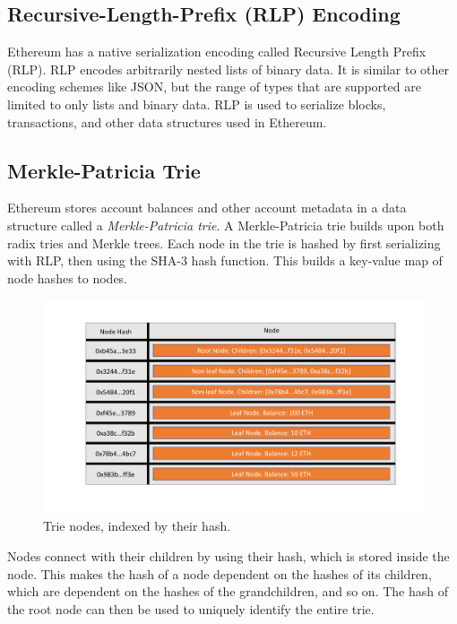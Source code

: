 \documentclass[12pt]{article}
\begin{document}
\subsection{Recursive-Length-Prefix (RLP) Encoding}

Ethereum has a native serialization encoding called Recursive Length Prefix (RLP). RLP encodes arbitrarily nested lists of binary data. It is similar to other encoding schemes like JSON, but the range of types that are supported are limited to only lists and binary data. RLP is used to serialize blocks, transactions, and other data structures used in Ethereum.

\subsection{Merkle-Patricia Trie}

Ethereum stores account balances and other account metadata in a data structure called a \emph{Merkle-Patricia trie}. A Merkle-Patricia trie builds upon both radix tries and Merkle trees. Each node in the trie is hashed by first serializing with RLP, then using the SHA-3 hash function. This builds a key-value map of node hashes to nodes.

\begin{figure}[H]
  \centering
  \includegraphics[width=\textwidth]{../figures/background/trie/tree_nodes.pdf}
  \caption{Trie nodes, indexed by their hash.} \label{fig:trienodes}
\end{figure}

Nodes connect with their children by using their hash, which is stored inside the node. This makes the hash of a node dependent on the hashes of its children, which are dependent on the hashes of the grandchildren, and so on. The hash of the root node can then be used to uniquely identify the entire trie.
\end{document}
